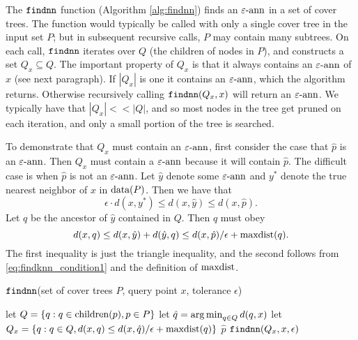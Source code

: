 \documentclass[../main.tex]{subfiles}
\newcommand{\dist}[2]{\distf({#1},{#2})}
\newcommand{\distf}{d}
\newcommand{\mkfunction}[1]{\ifmmode{\text{{#1}}}}
\newcommand{\children}[1]   {\mkfunction{children}({#1})}
\newcommand{\maxdist}[1]    {\mkfunction{maxdist}({#1})}
\newcommand{\data}[1]       {\mkfunction{data}({#1})}
\newcommand{\mkprocedure}[1]{\textnormal{\ttfamily {#1}}}
\newcommand{\findnn}{\mkprocedure{findnn}}
\begin{document}
The $\findnn$ function (Algorithm \ref{alg:findnn}) finds an $\varepsilon\text{-ann}$ in a set of cover trees.
The function would typically be called with only a single cover tree in the input set $P$;
but in subsequent recursive calls, $P$ may contain many subtrees. 
On each call,
$\findnn$ iterates over $Q$ (the children of nodes in $P$),
and constructs a set $Q_x \subseteq Q$.
The important property of $Q_x$ is that it always contains an $\varepsilon\text{-ann}$ of $x$
(see next paragraph).
If $|Q_x|$ is one it contains an $\varepsilon\text{-ann}$, which the algorithm returns.
Otherwise recursively calling $\findnn(Q_x,x)$ will return an $\varepsilon\text{-ann}$.
We typically have that $|Q_x| <\!\!< |Q|$, 
and so most nodes in the tree get pruned on each iteration,
and only a small portion of the tree is searched.

To demonstrate that $Q_x$ must contain an $\varepsilon\text{-ann}$,
first consider the case that $\hat p$ is an $\varepsilon\text{-ann}$.
Then $Q_x$ must contain a $\varepsilon\text{-ann}$ because it will contain $\hat p$.
The difficult case is when $\hat p$ is not an $\varepsilon\text{-ann}$.
Let $\hat y$ denote some $\varepsilon\text{-ann}$ and $y^*$ denote the true nearest neighbor of $x$ in $\data{P}$.
Then we have that
\begin{equation}
    \label{eq:findknn_condition1}
    \epsilon \cdot \dist{x}{y^*}
    \le \dist{x}{\hat y} 
    \le \dist{x}{\hat p} 
    .
\end{equation}
Let $q$ be the ancestor of $\hat y$ contained in $Q$.
Then $q$ must obey
\begin{equation}
    \label{eq:findnn_condition}
    \dist{x}{q} 
    \le \dist{x}{\hat y} + \dist{\hat y}{q}
    \le \dist{x}{\hat p}/\epsilon + \maxdist{q}
    .
\end{equation}
The first inequality is just the triangle inequality,
and the second follows from \eqref{eq:findknn_condition1} and the definition of $\mkfunction{maxdist}$.

\begin{algorithm}
\caption{$\findnn$(set of cover trees $P$, query  point $x$, tolerance $\epsilon$)}
\label{alg:findnn}
\vspace{0.1in}
\begin{algorithmic}[1]
    \State let $Q = \{ q : q\in\children{p}, p\in P \}$
    \State let $\hat q = \argmin_{q\in Q} \dist{q}{x}$
    \State let $Q_x = \{ q : q\in Q, \dist{x}{q} \le \dist{x}{\hat q}/\epsilon+\maxdist{q}\}$
        \State \Return $\hat p$
    \Else
        \State\Return $\findnn(Q_x,x,\epsilon)$
    \EndIf
\end{algorithmic}
\end{algorithm}
\end{document}
